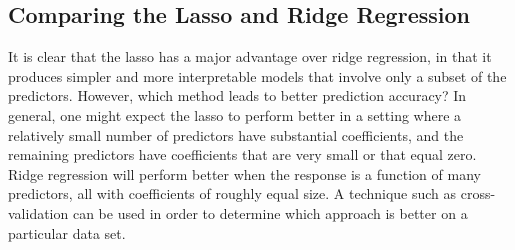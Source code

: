 \subsection{Comparing the Lasso and Ridge Regression}
It is clear that the lasso has a major advantage over ridge regression, in that it produces simpler and more interpretable models that involve only a subset of the predictors. However, which method leads to better prediction accuracy? In general, one might expect the lasso to perform better in a setting where a relatively small number of predictors have substantial coefficients, and the remaining predictors have coefficients that are very small or that equal zero. Ridge regression will perform better when the response is a function of many predictors, all with coefficients of roughly equal size. A technique such as cross-validation can be used in order to determine which approach is better on a particular data set.

